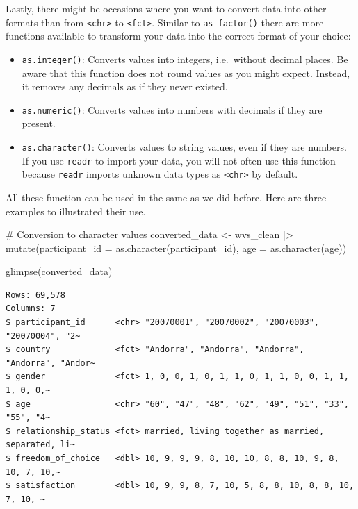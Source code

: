 \documentclass[
  letterpaper,
]{krantz}
\makeatletter
\newenvironment{Shaded}{\begin{snugshade}}{\end{snugshade}}
\newcommand{\AttributeTok}[1]{\textcolor[rgb]{0.40,0.45,0.13}{#1}}
\newcommand{\CommentTok}[1]{\textcolor[rgb]{0.37,0.37,0.37}{#1}}
\newcommand{\FunctionTok}[1]{\textcolor[rgb]{0.28,0.35,0.67}{#1}}
\newcommand{\NormalTok}[1]{\textcolor[rgb]{0.00,0.23,0.31}{#1}}
\newcommand{\OtherTok}[1]{\textcolor[rgb]{0.00,0.23,0.31}{#1}}
\newcommand{\SpecialCharTok}[1]{\textcolor[rgb]{0.37,0.37,0.37}{#1}}
\newenvironment{kframe}{%
\medskip{}
\setlength{\fboxsep}{.8em}
 \def\at@end@of@kframe{}%
 \ifinner\ifhmode%
  \def\at@end@of@kframe{\end{minipage}}%
  \begin{minipage}{\columnwidth}%
 \fi\fi%
 \def\FrameCommand##1{\hskip\@totalleftmargin \hskip-\fboxsep
 \colorbox{shadecolor}{##1}\hskip-\fboxsep
     \hskip-\linewidth \hskip-\@totalleftmargin \hskip\columnwidth}%
 \MakeFramed {\advance\hsize-\width
   \@totalleftmargin\z@ \linewidth\hsize
   \@setminipage}}%
 {\par\unskip\endMakeFramed%
 \at@end@of@kframe}
\renewenvironment{Shaded}{\begin{kframe}}{\end{kframe}}
\makeatother
\begin{document}
Lastly, there might be occasions where you want to convert data into
other formats than from \texttt{\textless{}chr\textgreater{}} to
\texttt{\textless{}fct\textgreater{}}. Similar to \texttt{as\_factor()}
there are more functions available to transform your data into the
correct format of your choice:

\begin{itemize}
\item
  \texttt{as.integer()}: Converts values into integers, i.e.~without
  decimal places. Be aware that this function does not round values as
  you might expect. Instead, it removes any decimals as if they never
  existed.
\item
  \texttt{as.numeric()}: Converts values into numbers with decimals if
  they are present.
\item
  \texttt{as.character()}: Converts values to string values, even if
  they are numbers. If you use \texttt{readr} to import your data, you
  will not often use this function because \texttt{readr} imports
  unknown data types as \texttt{\textless{}chr\textgreater{}} by
  default.
\end{itemize}

All these function can be used in the same as we did before. Here are
three examples to illustrated their use.

\begin{Shaded}
\begin{Highlighting}[]
\CommentTok{\# Conversion to character values}
\NormalTok{converted\_data }\OtherTok{\textless{}{-}}
\NormalTok{  wvs\_clean }\SpecialCharTok{|\textgreater{}}
  \FunctionTok{mutate}\NormalTok{(}\AttributeTok{participant\_id =} \FunctionTok{as.character}\NormalTok{(participant\_id),}
         \AttributeTok{age =} \FunctionTok{as.character}\NormalTok{(age))}

\FunctionTok{glimpse}\NormalTok{(converted\_data)}
\end{Highlighting}
\end{Shaded}

\begin{verbatim}
Rows: 69,578
Columns: 7
$ participant_id      <chr> "20070001", "20070002", "20070003", "20070004", "2~
$ country             <fct> "Andorra", "Andorra", "Andorra", "Andorra", "Andor~
$ gender              <fct> 1, 0, 0, 1, 0, 1, 1, 0, 1, 1, 0, 0, 1, 1, 1, 0, 0,~
$ age                 <chr> "60", "47", "48", "62", "49", "51", "33", "55", "4~
$ relationship_status <fct> married, living together as married, separated, li~
$ freedom_of_choice   <dbl> 10, 9, 9, 9, 8, 10, 10, 8, 8, 10, 9, 8, 10, 7, 10,~
$ satisfaction        <dbl> 10, 9, 9, 8, 7, 10, 5, 8, 8, 10, 8, 8, 10, 7, 10, ~
\end{verbatim}
\end{document}

